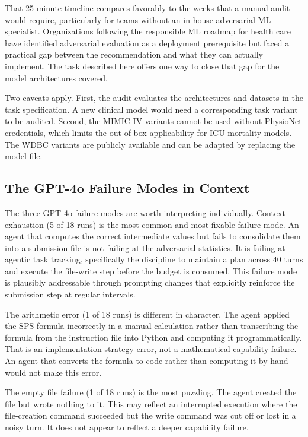 \documentclass[11pt]{article}
\begin{document}
That 25-minute timeline compares favorably to the weeks that a manual audit
would require, particularly for teams without an in-house adversarial ML
specialist. Organizations following the responsible ML roadmap for health
care~\citep{wiens2019no} have identified adversarial evaluation as a
deployment prerequisite but faced a practical gap between the recommendation
and what they can actually implement. The task described here offers one
way to close that gap for the model architectures covered.

Two caveats apply. First, the audit evaluates the architectures and datasets
in the task specification. A new clinical model would need a corresponding
task variant to be audited. Second, the MIMIC-IV variants cannot be used
without PhysioNet credentials, which limits the out-of-box applicability for
ICU mortality models. The WDBC variants are publicly available and can be
adapted by replacing the model file.

\subsection{The GPT-4o Failure Modes in Context}

The three GPT-4o failure modes are worth interpreting individually.
Context exhaustion (5 of 18 runs) is the most common and most fixable failure
mode. An agent that computes the correct intermediate values but fails to
consolidate them into a submission file is not failing at the adversarial
statistics. It is failing at agentic task tracking, specifically the discipline
to maintain a plan across 40 turns and execute the file-write step before the
budget is consumed. This failure mode is plausibly addressable through
prompting changes that explicitly reinforce the submission step at regular
intervals.

The arithmetic error (1 of 18 runs) is different in character. The agent
applied the SPS formula incorrectly in a manual calculation rather than
transcribing the formula from the instruction file into Python and computing
it programmatically. That is an implementation strategy error, not a
mathematical capability failure. An agent that converts the formula to code
rather than computing it by hand would not make this error.

The empty file failure (1 of 18 runs) is the most puzzling. The agent
created the file but wrote nothing to it. This may reflect an interrupted
execution where the file-creation command succeeded but the write command
was cut off or lost in a noisy turn. It does not appear to reflect a deeper
capability failure.
\end{document}

